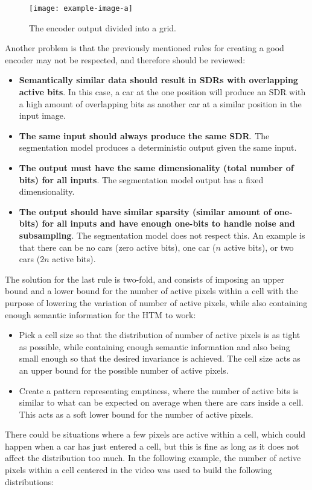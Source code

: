 \begin{figure}[H]
    \centering
    \texttt{[image: example-image-a]}
    \caption{The encoder output divided into a grid.}
    \label{fig:grid}
\end{figure}
Another problem is that the previously mentioned rules for creating a good encoder may not be respected, and therefore should be reviewed:
\begin{itemize}
    \item \textbf{Semantically similar data should result in SDRs with overlapping active bits}. In this case, a car at the one position will produce an SDR with a high amount of overlapping bits as another car at a similar position in the input image.
    \item \textbf{The same input should always produce the same SDR}. The segmentation model produces a deterministic output given the same input.
    \item \textbf{The output must have the same dimensionality (total number of bits) for all inputs}. The segmentation model output has a fixed dimensionality.
    \item \textbf{The output should have similar sparsity (similar amount of one-bits) for all inputs and have enough one-bits to handle noise and subsampling}. The segmentation model does not respect this. An example is that there can be no cars (zero active bits), one car ($n$ active bits), or two cars ($2n$ active bits).
\end{itemize}
The solution for the last rule is two-fold, and  consists of imposing an upper bound and a lower bound for the number of active pixels within a cell with the purpose of lowering the variation of number of active pixels, while also containing enough semantic information for the HTM to work:
\begin{itemize}
    \item Pick a cell size so that the distribution of number of active pixels is as tight as possible, while containing enough semantic information and also being small enough so that the desired invariance is achieved. The cell size acts as an upper bound for the possible number of active pixels.
    \item Create a pattern representing emptiness, where the number of active bits is similar to what can be expected on average when there are cars inside a cell. This acts as a soft lower bound for the number of active pixels.
\end{itemize}
There could be situations where a few pixels are active within a cell, which could happen when a car has just entered a cell, but this is fine as long as it does not affect the distribution too much. In the following example, the number of active pixels within a cell centered in the video was used to build the following distributions:
